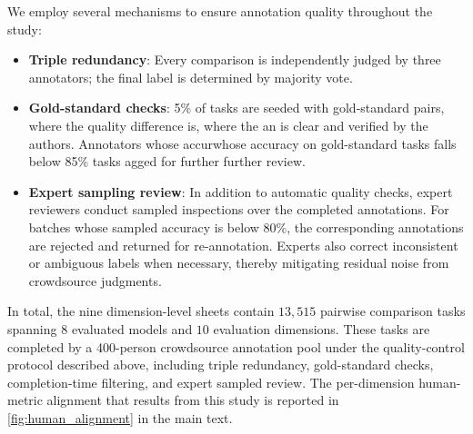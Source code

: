 We employ several mechanisms to ensure annotation quality throughout the study:
\begin{itemize}[nosep,leftmargin=*]
  \item \textbf{Triple redundancy}: Every comparison is independently judged by three annotators; the final label is determined by majority vote.
  \item \textbf{Gold-standard checks}: 5\% of tasks are seeded with gold-standard pairs, where the quality difference is, where the an is clear and verified by the authors. Annotators whose accurwhose accuracy on gold-standard tasks falls below 85\% tasks agged for further further review.
  \item \textbf{Expert sampling review}: In addition to automatic quality checks, expert reviewers conduct sampled inspections over the completed annotations. For batches whose sampled accuracy is below 80\%, the corresponding annotations are rejected and returned for re-annotation. Experts also correct inconsistent or ambiguous labels when necessary, thereby mitigating residual noise from crowdsource judgments.
\end{itemize}

In total, the nine dimension-level sheets contain $13{,}515$ pairwise comparison tasks spanning $8$ evaluated models and $10$ evaluation dimensions. These tasks are completed by a 400-person crowdsource annotation pool under the quality-control protocol described above, including triple redundancy, gold-standard checks, completion-time filtering, and expert sampled review. The per-dimension human-metric alignment that results from this study is reported in \cref{fig:human_alignment} in the main text.

